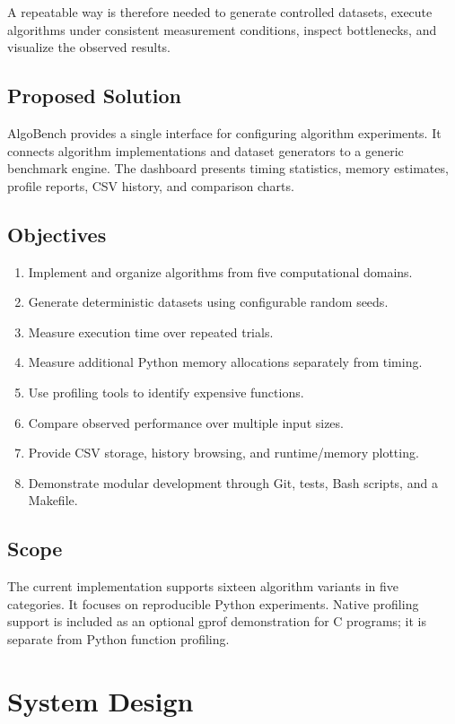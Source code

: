 \documentclass[11pt,a4paper]{report}
\begin{document}
A repeatable way is therefore needed to generate controlled datasets, execute
algorithms under consistent measurement conditions, inspect bottlenecks, and
visualize the observed results.

\section{Proposed Solution}
AlgoBench provides a single interface for configuring algorithm experiments.
It connects algorithm implementations and dataset generators to a generic
benchmark engine. The dashboard presents timing statistics, memory estimates,
profile reports, CSV history, and comparison charts.

\section{Objectives}
\begin{enumerate}[leftmargin=2em]
    \item Implement and organize algorithms from five computational domains.
    \item Generate deterministic datasets using configurable random seeds.
    \item Measure execution time over repeated trials.
    \item Measure additional Python memory allocations separately from timing.
    \item Use profiling tools to identify expensive functions.
    \item Compare observed performance over multiple input sizes.
    \item Provide CSV storage, history browsing, and runtime/memory plotting.
    \item Demonstrate modular development through Git, tests, Bash scripts, and a Makefile.
\end{enumerate}

\section{Scope}
The current implementation supports sixteen algorithm variants in five
categories. It focuses on reproducible Python experiments. Native profiling
support is included as an optional gprof demonstration for C programs; it is
separate from Python function profiling.

\chapter{System Design}
\end{document}
